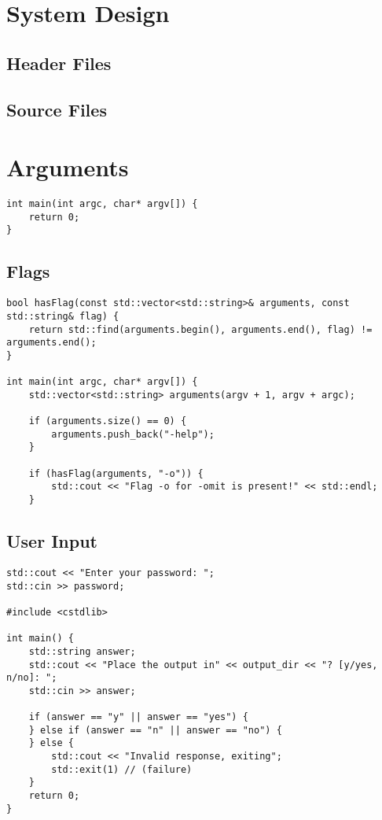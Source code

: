 \section{System Design}

\subsection{Header Files}

\subsection{Source Files}

\section{Arguments}

\begin{verbatim}
int main(int argc, char* argv[]) {
    return 0;
}
\end{verbatim}

\subsection{Flags}

\begin{verbatim}
bool hasFlag(const std::vector<std::string>& arguments, const std::string& flag) {
    return std::find(arguments.begin(), arguments.end(), flag) != arguments.end();
}

int main(int argc, char* argv[]) {
    std::vector<std::string> arguments(argv + 1, argv + argc);

    if (arguments.size() == 0) {
        arguments.push_back("-help");
    }

    if (hasFlag(arguments, "-o")) {
        std::cout << "Flag -o for -omit is present!" << std::endl;
    }
\end{verbatim}

\subsection{User Input}

\begin{verbatim}
std::cout << "Enter your password: ";
std::cin >> password;

#include <cstdlib>

int main() {
    std::string answer;
    std::cout << "Place the output in" << output_dir << "? [y/yes, n/no]: ";
    std::cin >> answer;

    if (answer == "y" || answer == "yes") {
    } else if (answer == "n" || answer == "no") {
    } else {
        std::cout << "Invalid response, exiting";
        std::exit(1) // (failure)
    }
    return 0;
}
\end{verbatim}



